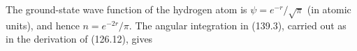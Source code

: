 \SolutionHeading The ground-state wave function of the hydrogen atom is $\psi=e^{-r}/\sqrt\pi$ (in atomic units), and hence $n=e^{-2r}/\pi$. The angular integration in (139.3), carried out as in the derivation of (126.12), gives
